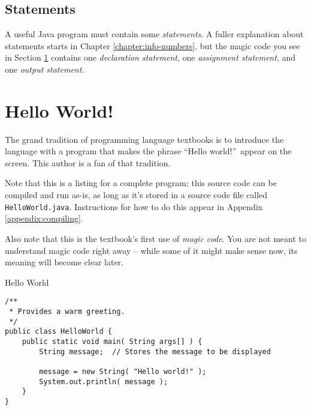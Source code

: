 \subsection{Statements}
A useful Java program must contain some \textit{statements}.  A fuller explanation about statements starts in Chapter \ref{chapter:info-numbers}, but the magic code you see in Section \ref{sec:helloworld} contains one \textit{declaration statement}, one \textit{assignment statement}, and one \textit{output statement}.

\section{Hello World!}
\label{sec:helloworld}

The grand tradition of programming language textbooks is to introduce the language with a program that makes the phrase ``Hello world!''\ appear on the screen.  This author is a fan of that tradition.

Note that this is a listing for a complete program; this source code can be compiled and run as-is, as long as it's stored in a source code file called \texttt{HelloWorld.java}.  Instructions for how to do this appear in Appendix \ref{appendix:compiling}.

Also note that this is the textbook's first use of \textit{magic code}.  You are not meant to understand magic code right away -- while some of it might make sense now, its meaning will become clear later.

\begin{magic}{Hello World}
\begin{verbatim}
/**
 * Provides a warm greeting.
 */
public class HelloWorld {
    public static void main( String args[] ) {
        String message;  // Stores the message to be displayed

        message = new String( "Hello world!" );
        System.out.println( message );
    }
}
\end{verbatim}
\end{magic}
